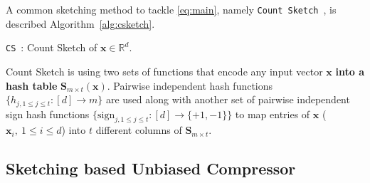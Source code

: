 \documentclass[twoside]{article}
\begin{document}
A common sketching method to tackle \eqref{eq:main}, namely \texttt{Count Sketch}~\cite{DBLP:journals/tcs/CharikarCF04}, is described Algorithm~\ref{alg:csketch}.
\begin{algorithm}[H]
\caption{\texttt{CS}~\cite{DBLP:journals/tcs/CharikarCF04}: Count Sketch of ${\boldsymbol{x}}\in\mathbb{R}^{d}$. }\label{alg:csketch}
\begin{algorithmic}[1]
\end{algorithmic}
\end{algorithm}
Count Sketch is using two sets of functions that encode any input vector $\boldsymbol{x}$ \textbf{into a hash table} $\boldsymbol{S}_{m\times t}(\boldsymbol{x})$. 
Pairwise independent hash functions $\{h_{j,1\leq j\leq t }:[d]\rightarrow m\}$ are used along with another set of pairwise independent sign hash functions $\{\text{sign}_{j,1\leq j\leq t}: [d]\rightarrow \{+1,-1\}\}$ to map entries of $\boldsymbol{x}$ ($\boldsymbol{x}_i, \:1\leq i\leq d$) into $t$ different columns of $\mathbf{S}_{m\times t}$. 

\vspace{-0.05in}
\subsection{Sketching based Unbiased Compressor}
\vspace{-0.05in}
\end{document}
